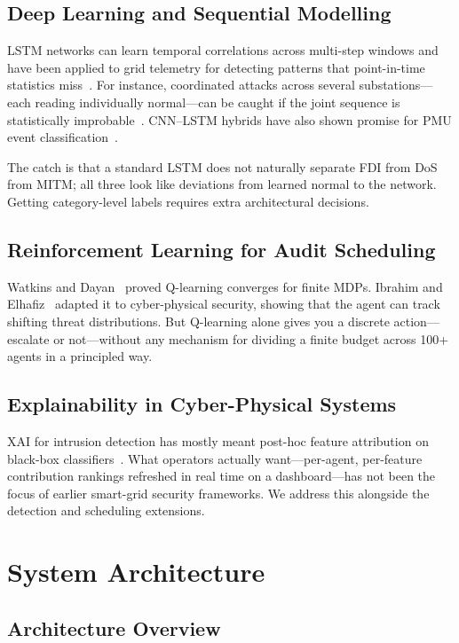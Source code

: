 \documentclass[conference]{IEEEtran}
\begin{document}
\subsection{Deep Learning and Sequential Modelling}

LSTM networks can learn temporal correlations across multi-step windows and have been applied to grid telemetry for detecting patterns that point-in-time statistics miss~\cite{b11}. For instance, coordinated attacks across several substations---each reading individually normal---can be caught if the joint sequence is statistically improbable~\cite{b12}. CNN--LSTM hybrids have also shown promise for PMU event classification~\cite{b13}.

The catch is that a standard LSTM does not naturally separate FDI from DoS from MITM; all three look like deviations from learned normal to the network. Getting category-level labels requires extra architectural decisions.

\subsection{Reinforcement Learning for Audit Scheduling}

Watkins and Dayan~\cite{b14} proved Q-learning converges for finite MDPs. Ibrahim and Elhafiz~\cite{b7} adapted it to cyber-physical security, showing that the agent can track shifting threat distributions. But Q-learning alone gives you a discrete action---escalate or not---without any mechanism for dividing a finite budget across 100+ agents in a principled way.

\subsection{Explainability in Cyber-Physical Systems}

XAI for intrusion detection has mostly meant post-hoc feature attribution on black-box classifiers~\cite{b15}. What operators actually want---per-agent, per-feature contribution rankings refreshed in real time on a dashboard---has not been the focus of earlier smart-grid security frameworks. We address this alongside the detection and scheduling extensions.

\section{System Architecture}

\subsection{Architecture Overview}
\end{document}
